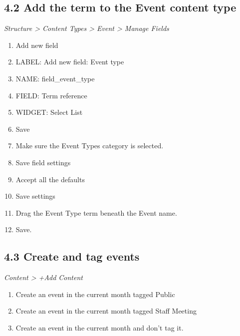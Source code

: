 \documentclass[letterpaper,10pt,english]{sphinxmanual}
\begin{document}
\subsection{4.2 Add the term to the Event content type}
\label{event_calendar:add-the-term-to-the-event-content-type}
\emph{Structure \textgreater{} Content Types \textgreater{} Event \textgreater{} Manage Fields}
\begin{enumerate}
\item {} 
Add new field

\item {} 
LABEL: Add new field: Event type

\item {} 
NAME: field\_event\_type

\item {} 
FIELD: Term reference

\item {} 
WIDGET: Select List

\item {} 
Save

\item {} 
Make sure the Event Types category is selected.

\item {} 
Save field settings

\item {} 
Accept all the defaults

\item {} 
Save settings

\item {} 
Drag the Event Type term beneath the Event name.

\item {} 
Save.

\end{enumerate}


\subsection{4.3 Create and tag events}
\label{event_calendar:create-and-tag-events}
\emph{Content \textgreater{} +Add Content}
\begin{enumerate}
\item {} 
Create an event in the current month tagged Public

\item {} 
Create an event in the current month tagged Staff Meeting

\item {} 
Create an event in the current month and don't tag it.

\end{enumerate}
\end{document}
